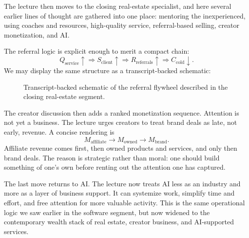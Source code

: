 The lecture then moves to the closing real-estate specialist, and here several earlier lines of thought are gathered into one place: mentoring the inexperienced, using coaches and resources, high-quality service, referral-based selling, creator monetization, and AI.

The referral logic is explicit enough to merit a compact chain:
\begin{equation}
Q_{\text{service}}\uparrow
\Rightarrow
S_{\text{client}}\uparrow
\Rightarrow
R_{\text{referrals}}\uparrow
\Rightarrow
C_{\text{cold}}\downarrow.
\end{equation}
We may display the same structure as a transcript-backed schematic:

\begin{figure}[h]
\centering
{}
\caption{Transcript-backed schematic of the referral flywheel described in the closing real-estate segment.}
\end{figure}

The creator discussion then adds a ranked monetization sequence. Attention is not yet a business. The lecture urges creators to treat brand deals as late, not early, revenue. A concise rendering is
\begin{equation}
M_{\text{affiliate}} \rightarrow M_{\text{owned}} \rightarrow M_{\text{brand}}.
\end{equation}
Affiliate revenue comes first, then owned products and services, and only then brand deals. The reason is strategic rather than moral: one should build something of one's own before renting out the attention one has captured.

The last move returns to AI. The lecture now treats AI less as an industry and more as a layer of business support. It can systemize work, simplify time and effort, and free attention for more valuable activity. This is the same operational logic we saw earlier in the software segment, but now widened to the contemporary wealth stack of real estate, creator business, and AI-supported services.

